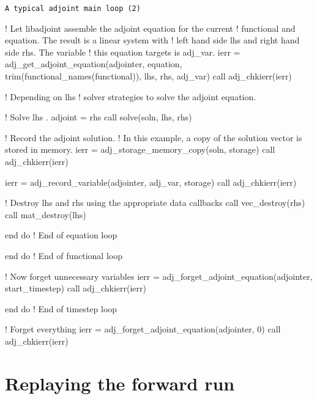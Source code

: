 \begin{boxwithtitle}{\texttt{A typical adjoint main loop (2)}}
\begin{minipage}{\columnwidth}
\begin{fortrancode}   
        ! Let libadjoint assemble the adjoint equation for the current 
        ! functional and equation. The result is a linear system with 
        ! left hand side lhs and right hand side rhs. The variable 
        ! this equation targets is adj_var. 
        ierr = adj_get_adjoint_equation(adjointer, equation, 
                                        trim(functional_names(functional)), 
                                        lhs, rhs, adj_var)
        call adj_chkierr(ierr)

        ! Depending on lhs%
        ! solver strategies to solve the adjoint equation.

        ! Solve lhs . adjoint = rhs 
        call solve(soln, lhs, rhs)

        ! Record the adjoint solution. 
        ! In this example, a copy of the solution vector is stored in memory.
        ierr = adj_storage_memory_copy(soln, storage)
        call adj_chkierr(ierr)

        ierr = adj_record_variable(adjointer, adj_var, storage)
        call adj_chkierr(ierr)

        ! Destroy lhs and rhs using the appropriate data callbacks
        call vec_destroy(rhs)
        call mat_destroy(lhs)

      end do ! End of equation loop
      
    end do ! End of functional loop

    ! Now forget unnecessary variables
    ierr = adj_forget_adjoint_equation(adjointer, start_timestep)
    call adj_chkierr(ierr)

  end do ! End of timestep loop

  ! Forget everything
  ierr = adj_forget_adjoint_equation(adjointer, 0)
  call adj_chkierr(ierr)
\end{fortrancode}
\end{minipage}
\end{boxwithtitle}


\section{Replaying the forward run} \label{sec:replay}


